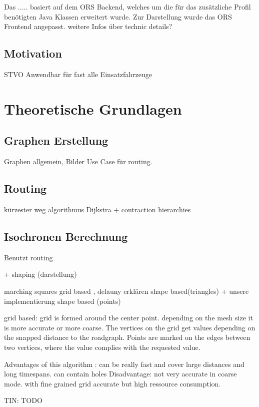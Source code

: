 \documentclass[10pt,a4paper]{article}
\begin{document}
Das ..... basiert auf dem ORS Backend, welches um die für das zusätzliche Profil benötigten Java Klassen erweitert wurde. Zur Darstellung wurde das ORS Frontend angepasst. 
weitere Infos über technic details? 

\subsection{Motivation}

STVO
Anwendbar für fast alle Einsatzfahrzeuge 

\section{Theoretische Grundlagen}

\subsection{Graphen Erstellung}

Graphen allgemein,
Bilder
Use Case für routing.

\subsection{Routing}

kürzester weg 
algorithmus Dijkstra + contraction hierarchies

\subsection{Isochronen Berechnung}

Benutzt routing

+ shaping (darstellung)

marching squares grid based , delauny erklären shape based(triangles) + unsere implementierung shape based (points)

grid based:
 grid is formed around the center point. depending on the mesh size it is more accurate or more coarse.
 The vertices on the grid get values depending on the snapped distance to the roadgraph.
 Points are marked on the edges between two vertices, where the value complies with the requested value.
 
Advantages of this algorithm : can be really fast and cover large distances and long timespans. can contain holes
Disadvantage: not very accurate in coarse mode. with fine grained grid accurate but high ressource consumption.

TIN:
TODO
\end{document}

